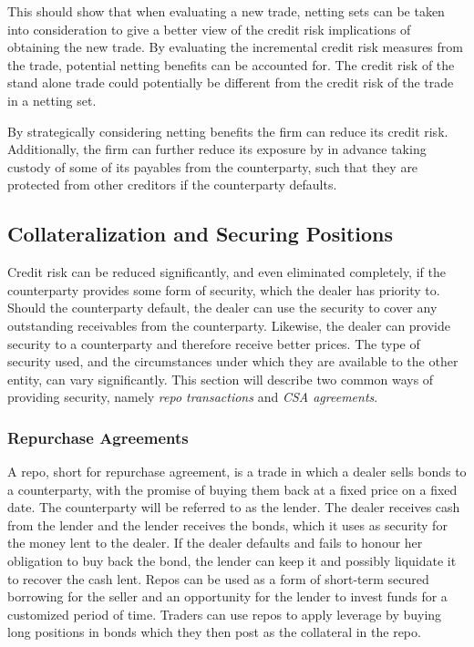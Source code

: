 \documentclass[main.tex]{subfiles}
\begin{document}
        This should show that when evaluating a new trade,
        netting sets can be taken into consideration to give a better view 
        of the credit risk implications of obtaining the new trade.
        By evaluating the incremental credit risk measures from the trade,
        potential netting benefits can be accounted for. 
        The credit risk of the stand alone trade could potentially 
        be different from the credit risk of the trade in a netting set.

        By strategically considering netting benefits the firm can reduce its credit risk. 
        Additionally, the firm can further reduce its exposure by in advance
        taking custody of some of its payables from the counterparty,
        such that they are protected from other creditors if the counterparty defaults.

    \subsection{Collateralization and Securing Positions}
        Credit risk can be reduced significantly, and even eliminated completely,
        if the counterparty provides some form of security, which the dealer has priority to.
        Should the counterparty default, the dealer can use the security to cover any
        outstanding receivables from the counterparty. 
        Likewise, the dealer can provide security to a counterparty and 
        therefore receive better prices.
        The type of security used, and the circumstances 
        under which they are available to the other entity, can vary significantly.
        This section will describe two common ways of providing security, 
        namely \textit{repo transactions} and \textit{CSA agreements}.

        \subsubsection{Repurchase Agreements}
        A repo, short for repurchase agreement, is a trade in which a dealer 
        sells bonds to a counterparty,
        with the promise of buying them back at a fixed price on a fixed date.
        The counterparty will be referred to as the lender.
        The dealer receives cash from the lender and the lender receives the bonds,
        which it uses as security for the money lent to the dealer. 
        If the dealer defaults and fails to honour her obligation to buy back the bond,
        the lender can keep it and possibly liquidate it to recover the cash lent. 
        Repos can be used as a form of short-term secured borrowing for the seller
        and an opportunity for the lender to invest funds for a customized period of time. 
        Traders can use repos to apply leverage by buying long positions in bonds 
        which they then post as the collateral in the repo. 
\end{document}
